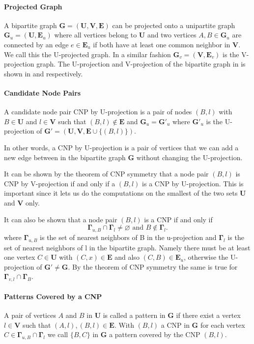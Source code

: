 \paragraph{Projected Graph}
A bipartite graph $\textbf{G} = (\textbf{U},\textbf{V},\textbf{E})$ can be projected onto a unipartite graph $\textbf{G}_u = (\textbf{U},\textbf{E}_u)$ where all vertices belong to $\textbf{U}$ and two vertices $A,B\in\textbf{G}_u$ are connected by an edge $e\in\textbf{E}_u$ if both have at least one common neighbor in $\textbf{V}$. We call this the U-projected graph. In a similar fashion $\textbf{G}_v = (\textbf{V},\textbf{E}_v)$ is the V-projection graph. The U-projection and V-projection of the bipartite graph in  is shown in  and  respectively.

\paragraph{Candidate Node Pairs}
A candidate node pair CNP by U-projection is a pair of nodes $(B,l)$ with $B\in\textbf{U}$ and $l\in\textbf{V}$ such that $(B,l)\notin\textbf{E}$ and $\textbf{G}_u=\textbf{G}'_u$ where $\textbf{G}'_u$ is the U-projection of $\textbf{G}'=(\textbf{U},\textbf{V},\textbf{E}\cup\{(B,l)\})$.

In other words, a CNP by U-projection is a pair of vertices that we can add a new edge between in the bipartite graph $\textbf{G}$ without changing the U-projection. 

It can be shown \cite{plp} by the theorem of CNP symmetry that  a node pair $(B,l)$ is CNP by V-projection if and only if a $(B,l)$ is a CNP by U-projection. This is important since it lets us do the computations on the smallest of the two sets $\textbf{U}$ and $\textbf{V}$ only.

It can also be shown \cite{plp} that a node pair $(B,l)$ is a CNP if and only if 
$$
\mathbf{\Gamma}_{u,B}\cap\bm{\Gamma}_l \neq \varnothing\text{ and } B\notin \mathbf{\Gamma}_l.
$$
where $\bm{\Gamma}_{u,B}$ is the set of nearest neighbors of B in the u-projection and $\bm{\Gamma}_l$ is the set of nearest neighbors of l in the bipartite graph. Namely there must be at least one vertex $C\in\textbf{U}$ with $(C,x)\in\textbf{E}$ and also $(C,B)\in\textbf{E}_u$, otherwise the U-projection of $\textbf{G}'\neq\textbf{G}$. By the theorem of CNP symmetry the same is true for $\bm{\Gamma}_{v,l}\cap\bm{\Gamma}_{B}$.

\paragraph{Patterns Covered by a CNP}
A pair of vertices $A$ and $B$ in $\textbf{U}$ is called a pattern in $\textbf{G}$ if there exist a vertex $l\in\textbf{V}$ such that $(A,l),(B,l)\in\textbf{E}$. With $(B,l)$ a CNP in $\textbf{G}$ for each vertex $C\in\bm{\Gamma}_{u,B}\cap\bm{\Gamma}_{l}$ we call $\{B,C\}$ in $\textbf{G}$ a pattern covered by the CNP $(B,l)$.


